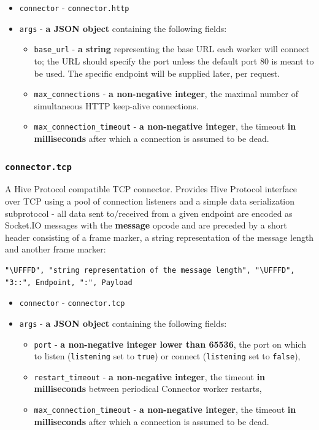 \documentclass[a4paper]{article}
\begin{document}
\begin{itemize}
\item \texttt{connector} - \texttt{connector.http}
\item \texttt{args} - \textbf{a JSON object} containing the following fields:
\begin{itemize}
\item \texttt{base\_url} - \textbf{a string} representing the base URL each worker will connect to; the URL should specify the port unless the default port 80 is meant to be used. The specific endpoint will be supplied later, per request.
\item \texttt{max\_connections} - \textbf{a non-negative integer}, the maximal number of simultaneous HTTP keep-alive connections.
\item \texttt{max\_connection\_timeout} - \textbf{a non-negative integer}, the timeout \textbf{in milliseconds} after which a connection is assumed to be dead.
\end{itemize}
\end{itemize}
\subsubsection{\texttt{connector.tcp}}
\label{sec-9-4-3}

A Hive Protocol compatible TCP connector. Provides Hive Protocol interface over TCP using a pool of connection listeners and a simple data serialization subprotocol - all data sent to/received from a given endpoint are encoded as Socket.IO messages with the \textbf{message} opcode and are preceded by a short header consisting of a frame marker, a string representation of the message length and another frame marker:


\begin{verbatim}
"\UFFFD", "string representation of the message length", "\UFFFD", "3::", Endpoint, ":", Payload
\end{verbatim}





\begin{itemize}
\item \texttt{connector} - \texttt{connector.tcp}
\item \texttt{args} - \textbf{a JSON object} containing the following fields:
\begin{itemize}
\item \texttt{port} - \textbf{a non-negative integer lower than 65536}, the port on which to listen (\texttt{listening} set to \texttt{true}) or connect (\texttt{listening} set to \texttt{false}),
\item \texttt{restart\_timeout} - \textbf{a non-negative integer}, the timeout \textbf{in milliseconds} between periodical Connector worker restarts,
\item \texttt{max\_connection\_timeout} - \textbf{a non-negative integer}, the timeout \textbf{in milliseconds} after which a connection is assumed to be dead.
\end{itemize}
\end{itemize}
\end{document}
